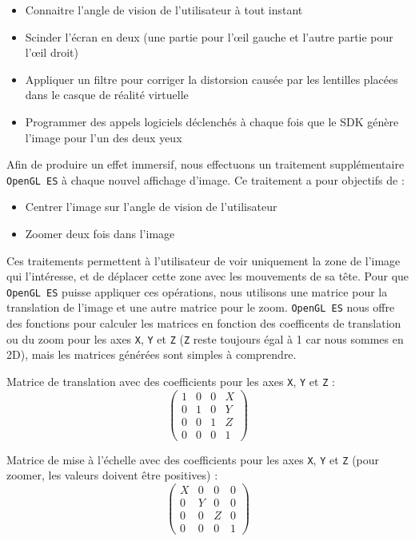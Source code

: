 \documentclass[11pt,a4paper]{article}
\begin{document}
\bigbreak
\begin{itemize}
\item{Connaitre l'angle de vision de l'utilisateur à tout instant}
\item{Scinder l'écran en deux (une partie pour l'œil gauche et l'autre partie pour l'œil droit)}
\item{Appliquer un filtre pour corriger la distorsion causée par les lentilles placées dans le casque de réalité virtuelle}
\item{Programmer des appels logiciels déclenchés à chaque fois que le SDK génère l'image pour l'un des deux yeux}
\end{itemize}

\bigbreak
Afin de produire un effet immersif, nous effectuons un traitement supplémentaire \texttt{OpenGL ES} à chaque nouvel affichage d'image.
Ce traitement a pour objectifs de :

\bigbreak
\begin{itemize}
\item{Centrer l'image sur l'angle de vision de l'utilisateur}
\item{Zoomer deux fois dans l'image}
\end{itemize}

\bigbreak
Ces traitements permettent à l'utilisateur de voir uniquement la zone de l'image qui l'intéresse, et de déplacer cette zone avec les mouvements de sa tête.
Pour que \texttt{OpenGL ES} puisse appliquer ces opérations, nous utilisons une matrice pour la translation de l'image et une autre matrice pour le zoom.
\texttt{OpenGL ES} nous offre des fonctions pour calculer les matrices en fonction des coefficents de translation ou du zoom pour les axes \texttt{X}, \texttt{Y} et \texttt{Z} (\texttt{Z} reste toujours égal à 1 car nous sommes en 2D), mais les matrices générées sont simples à comprendre.

\bigbreak
Matrice de translation avec des coefficients pour les axes \texttt{X}, \texttt{Y} et \texttt{Z} :
\[ \left( \begin{array}{cccc}
1 & 0 & 0 & X \\
0 & 1 & 0 & Y \\
0 & 0 & 1 & Z \\
0 & 0 & 0 & 1 \end{array} \right)\] 

\bigbreak
Matrice de mise à l'échelle avec des coefficients pour les axes \texttt{X}, \texttt{Y} et \texttt{Z} (pour zoomer, les valeurs doivent être positives) :
\[ \left( \begin{array}{cccc}
X & 0 & 0 & 0 \\
0 & Y & 0 & 0 \\
0 & 0 & Z & 0 \\
0 & 0 & 0 & 1 \end{array} \right)\] 
\end{document}
